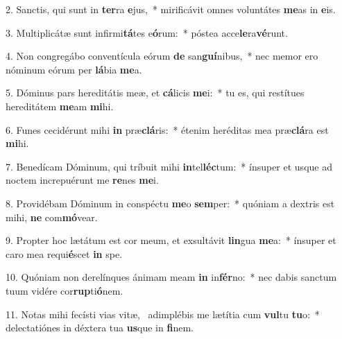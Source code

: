 2. Sanctis, qui sunt in \textbf{ter}ra \textbf{e}jus,~*  mirificávit omnes voluntátes \textbf{me}as in \textbf{e}is.\

3. Multiplicátæ sunt infirmi\textbf{tá}tes e\textbf{ó}rum:~*  póstea acce\textbf{le}ra\textbf{vé}runt.\

4. Non congregábo conventícula eórum \textbf{de} san\textbf{guí}nibus,~*  nec memor ero nóminum eórum per \textbf{lá}bia \textbf{me}a.\

5. Dóminus pars hereditátis meæ, et \textbf{cá}licis \textbf{me}i:~*  tu es, qui restítues hereditátem \textbf{me}am \textbf{mi}hi.\

6. Funes cecidérunt mihi \textbf{in} præ\textbf{clá}ris:~*  étenim heréditas mea præ\textbf{clá}ra est \textbf{mi}hi.\

7. Benedícam Dóminum, qui tríbuit mihi \textbf{in}tel\textbf{léc}tum:~*  ínsuper et usque ad noctem increpuérunt me \textbf{re}nes \textbf{me}i.\

8. Providébam Dóminum in conspéctu \textbf{me}o \textbf{sem}per:~*  quóniam a dextris est mihi, \textbf{ne} com\textbf{mó}vear.\

9. Propter hoc lætátum est cor meum, et exsultávit \textbf{lin}gua \textbf{me}a:~*  ínsuper et caro mea requi\textbf{é}scet \textbf{in} spe.\

10. Quóniam non derelínques ánimam meam \textbf{in} in\textbf{fér}no:~*  nec dabis sanctum tuum vidére cor\textbf{rup}ti\textbf{ó}nem.\

11. Notas mihi fecísti vias vitæ, \dag\  adimplébis me lætítia cum \textbf{vul}tu \textbf{tu}o:~*  delectatiónes in déxtera tua \textbf{us}que in \textbf{fi}nem.\

